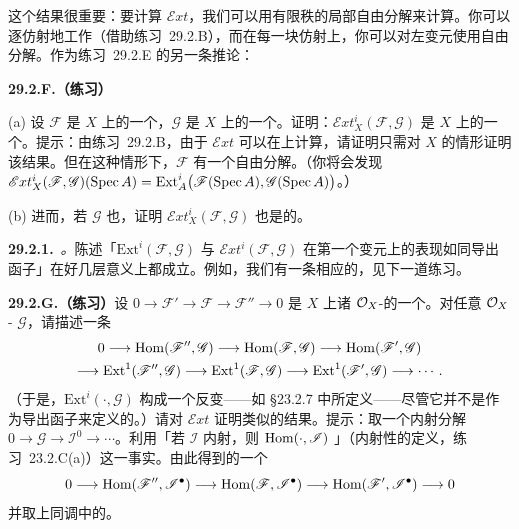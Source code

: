 这个结果很重要：要计算 $\mathscr{E}xt$，我们可以用有限秩的局部自由分解来计算。你可以逐仿射地工作（借助\mbox{练习~29.2.B}），而在每一块仿射上，你可以对左变元使用自由分解。作为\mbox{练习~29.2.E} 的另一条推论：

\textbf{29.2.F.（练习）}

(a) 设 $\mathscr{F}$ 是\trLocally\trNoetherian{}\trScheme{} $X$ 上的一个\trCoherentSheaf，$\mathscr{G}$ 是 $X$ 上的一个\trQCSheaf。证明：$\mathscr{E}xt^i_X(\mathscr{F},\mathscr{G})$ 是 $X$ 上的一个\trQCSheaf。提示：由\mbox{练习~29.2.B}，由于 $\mathscr{E}xt$ 可以在\trOpenCover{}上计算，请证明只需对 $X$ \trAffine{}的情形证明该结果。但在这种情形下，$\mathscr{F}$ 有一个自由分解。（你将会发现 $\mathscr{E}xt^i_X(\mathscr{F},\mathscr{G})(\operatorname{Spec} A)=\mathrm{Ext}^i_A\bigl(\mathscr{F}(\operatorname{Spec} A),\mathscr{G}(\operatorname{Spec} A)\bigr)$。）

(b) 进而，若 $\mathscr{G}$ 也\trCoh，证明 $\mathscr{E}xt^i_X(\mathscr{F},\mathscr{G})$ 也是\trCoh{}的。

\textbf{29.2.1.}\ \emph{\trhRemark。}\quad 陈述「$\mathrm{Ext}^i(\mathscr{F},\mathscr{G})$ 与 $\mathscr{E}xt^i(\mathscr{F},\mathscr{G})$ 在第一个变元上的表现如同导出函子」在好几层意义上都成立。例如，我们有一条相应的\trLongExactSequence，见下一道练习。

\textbf{29.2.G.（练习）}\quad 设 $0\to\mathscr{F}'\to\mathscr{F}\to\mathscr{F}''\to 0$ 是\trRingedSpace{} $X$ 上诸 $\mathcal{O}_X$-\trModule{}的一个\trExactSequence。对任意 $\mathcal{O}_X$-\trModule{} $\mathscr{G}$，请描述一条\trLongExactSequence
\[
\begin{gathered}
0\longrightarrow\operatorname{Hom}(\mathscr{F}'',\mathscr{G})\longrightarrow\operatorname{Hom}(\mathscr{F},\mathscr{G})\longrightarrow\operatorname{Hom}(\mathscr{F}',\mathscr{G})\\
\longrightarrow\mathrm{Ext}^1(\mathscr{F}'',\mathscr{G})\longrightarrow\mathrm{Ext}^1(\mathscr{F},\mathscr{G})\longrightarrow\mathrm{Ext}^1(\mathscr{F}',\mathscr{G})\longrightarrow\cdots.
\end{gathered}
\]
（于是，$\mathrm{Ext}^i(\cdot,\mathscr{G})$ 构成一个反变\trDeltaFunctor——如 \S23.2.7 中所定义——尽管它并不是作为导出函子来定义的。）请对 $\mathscr{E}xt$ 证明类似的结果。提示：取一个内射分解 $0\to\mathscr{G}\to\mathscr{I}^0\to\cdots$。利用「若 $\mathscr{I}$ 内射，则 $\operatorname{Hom}(\cdot,\mathscr{I})$ \trExact」（内射性的定义，\mbox{练习~23.2.C(a)}）这一事实。由此得到\trComplexN{}的一个\trShortExactSequence
\[
0\longrightarrow\operatorname{Hom}(\mathscr{F}'',\mathscr{I}^{\bullet})\longrightarrow\operatorname{Hom}(\mathscr{F},\mathscr{I}^{\bullet})\longrightarrow\operatorname{Hom}(\mathscr{F}',\mathscr{I}^{\bullet})\longrightarrow 0
\]
并取上同调中的\trLongExactSequence。


